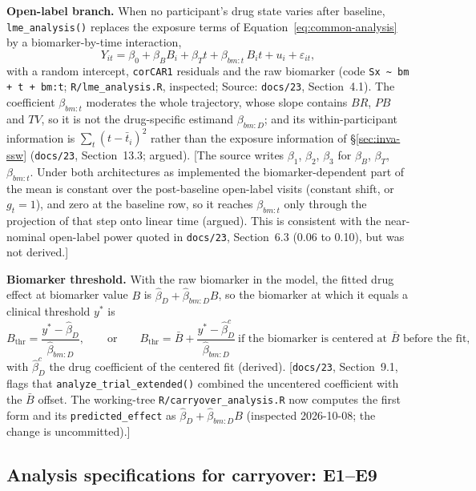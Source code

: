 \documentclass[11pt]{article}
\newcommand{\note}[1]{\textcolor{blue!60!black}{\small [#1]}}
\newcommand{\code}[1]{\texttt{#1}}
\begin{document}
\textbf{Open-label branch.} When no participant's drug state varies
after baseline, \code{lme\_analysis()} replaces the exposure terms of
Equation~\eqref{eq:common-analysis} by a biomarker-by-time interaction,
\begin{equation}
Y_{it} = \beta_0 + \beta_B B_i + \beta_T t + \beta_{bm:t}\,B_i t
  + u_i + \varepsilon_{it},
\label{eq:inva-ol}
\end{equation}
with a random intercept, \code{corCAR1} residuals and the raw
biomarker (code \code{Sx \textasciitilde\ bm + t + bm:t};
\code{R/lme\_analysis.R}, inspected; Source: \code{docs/23},
Section~4.1). The coefficient $\beta_{bm:t}$ moderates the whole
trajectory, whose slope contains $BR$, $PB$ and $TV$, so it is not the
drug-specific estimand $\beta_{bm:D}$; and its within-participant
information is $\sum_t (t - \bar t_i)^2$ rather than the exposure
information of \S\ref{sec:inva-ssw} (\code{docs/23}, Section~13.3;
argued). \note{The source writes $\beta_1$, $\beta_2$, $\beta_3$ for
$\beta_B$, $\beta_T$, $\beta_{bm:t}$. Under both architectures as
implemented the biomarker-dependent part of the mean is constant over
the post-baseline open-label visits (constant shift, or $g_t = 1$), and
zero at the baseline row, so it reaches $\beta_{bm:t}$ only through the
projection of that step onto linear time (argued). This is consistent
with the near-nominal open-label power quoted in \code{docs/23},
Section~6.3 (0.06 to 0.10), but was not derived.}

\textbf{Biomarker threshold.} With the raw biomarker in the model, the
fitted drug effect at biomarker value $B$ is
$\hat\beta_D + \hat\beta_{bm:D}B$, so the biomarker at which it equals a
clinical threshold $y^\ast$ is
\begin{equation}
B_{\text{thr}} = \frac{y^\ast - \hat\beta_D}{\hat\beta_{bm:D}},
\qquad\text{or}\qquad
B_{\text{thr}} = \bar B + \frac{y^\ast - \hat\beta_D^{c}}{\hat\beta_{bm:D}}
\ \text{if the biomarker is centered at } \bar B \text{ before the fit},
\label{eq:inva-threshold}
\end{equation}
with $\hat\beta_D^{c}$ the drug coefficient of the centered fit
(derived). \note{\code{docs/23}, Section~9.1, flags that
\code{analyze\_trial\_extended()} combined the uncentered coefficient
with the $\bar B$ offset. The working-tree \code{R/carryover\_analysis.R}
now computes the first form and its \code{predicted\_effect} as
$\hat\beta_D + \hat\beta_{bm:D}B$ (inspected 2026-10-08; the change is
uncommitted).}

\subsection{Analysis specifications for carryover: E1--E9}
\label{sec:e-specs}
\end{document}

